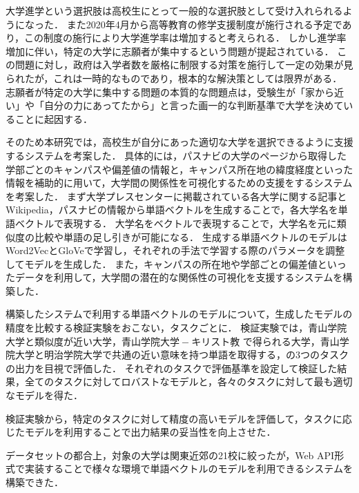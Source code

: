
大学進学という選択肢は高校生にとって一般的な選択肢として受け入れられるようになった．
また2020年4月から高等教育の修学支援制度が施行される予定であり，この制度の施行により大学進学率は増加すると考えられる．
しかし進学率増加に伴い，特定の大学に志願者が集中するという問題が提起されている．
この問題に対し，政府は入学者数を厳格に制限する対策を施行して一定の効果が見られたが，これは一時的なものであり，根本的な解決策としては限界がある．
志願者が特定の大学に集中する問題の本質的な問題点は，受験生が「家から近い」や「自分の力にあってたから」と言った画一的な判断基準で大学を決めていることに起因する．

そのため本研究では，高校生が自分にあった適切な大学を選択できるように支援するシステムを考案した．
具体的には，パスナビの大学のページから取得した学部ごとのキャンパスや偏差値の情報と，キャンパス所在地の緯度経度といった情報を補助的に用いて，大学間の関係性を可視化するための支援をするシステムを考案した．
まず大学プレスセンターに掲載されている各大学に関する記事とWikipedia，パスナビの情報から単語ベクトルを生成することで，各大学名を単語ベクトルで表現する．
大学名をベクトルで表現することで，大学名を元に類似度の比較や単語の足し引きが可能になる．
生成する単語ベクトルのモデルはWord2VecとGloVeで学習し，それぞれの手法で学習する際のパラメータを調整してモデルを生成した．
また，キャンパスの所在地や学部ごとの偏差値といったデータを利用して，大学間の潜在的な関係性の可視化を支援するシステムを構築した．

構築したシステムで利用する単語ベクトルのモデルについて，生成したモデルの精度を比較する検証実験をおこない，タスクごとに．
検証実験では，青山学院大学と類似度が近い大学，$ 青山学院大学 - キリスト教 $ で得られる大学，青山学院大学と明治学院大学で共通の近い意味を持つ単語を取得する，の3つのタスクの出力を目視で評価した．
それぞれのタスクで評価基準を設定して検証した結果，全てのタスクに対してロバストなモデルと，各々のタスクに対して最も適切なモデルを得た．

検証実験から，特定のタスクに対して精度の高いモデルを評価して，タスクに応じたモデルを利用することで出力結果の妥当性を向上させた．

データセットの都合上，対象の大学は関東近郊の21校に絞ったが，Web API形式で実装することで様々な環境で単語ベクトルのモデルを利用できるシステムを構築できた．
